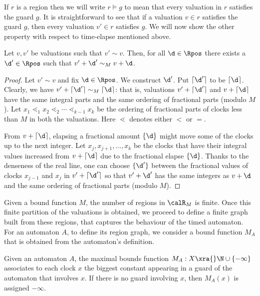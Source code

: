 If $r$ is a region then we will write $r \models g$ to mean that every valuation in $r$ satisfies the guard $g$. It is straightforward to see that if a valuation $v \in r$ satisfies the guard $g$, then every valuation $v' \in r$ satisfies $g$. We will now show the other property with respect to time-elapse mentioned above.

\begin{lemma}
Let $v, v'$ be valuations such that $v' \sim v$. Then, for all $\d \in \Rpos$ there exists a $\d' \in \Rpos$ such that $v' + \d' \sim_M v + \d$.
\end{lemma}

\begin{proof}
Let $v' \sim v$ and fix $\d \in \Rpos$. We construct $\d'$. Put $\lceil \d' \rceil$ to be $\lceil \d \rceil$. Clearly, we have $v' + \lceil \d' \rceil \sim_M \lceil \d \rceil$: that is, valuations $v' + \lceil \d' \rceil$ and $v + \lceil \d \rceil$ have the same integral parts and the same ordering of fractional parts (modulo $M$). Let $x_1 \lessdot_1 x_2 \lessdot_2 \cdots \lessdot_{k - 1} x_k$ be the ordering of fractional parts of clocks less than $M$ in both the valuations. Here $\lessdot$ denotes either $<$ or $=$. 

From $v + \lceil \d \rceil$, elapsing a fractional amount $\{\d\}$ might move some of the clocks up to the next integer. Let $x_j, x_{j + 1}, \dots, x_k$ be the clocks that have their integral values increased from $v + \lceil \d \rceil$ due to the fractional elapse $\{\d\}$. Thanks to the denseness of the real line, one can choose $\{\d'\}$ between the fractional values of clocks $x_{j - 1}$ and $x_j$ in $v' + \lceil \d' \rceil$ so that $v' + \d'$ has the same integers as $v + \d$ and the same ordering of fractional parts (modulo $M$).
\end{proof}

Given a bound function $M$, the number of regions in $\calR_M$ is finite. Once this finite partition of the valuations is obtained, we proceed to define a finite graph built from these regions, that captures the behaviour of the timed automaton. For an automaton $A$, to define its region graph, we consider a bound function $M_A$ that is obtained from the automaton’s definition.

\begin{definition}
Given an automaton $A$, the maximal bounds function $M_A: X \xra{} \N \cup \{-\infty\}$ associates to each clock $x$ the biggest constant appearing in a guard of the automaton that involves $x$. If there is no guard involving $x$, then $M_A(x)$ is assigned $-\infty$.
\end{definition}

